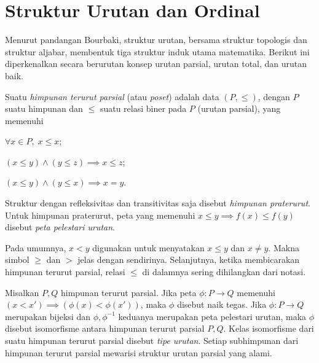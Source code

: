 \section{Struktur Urutan dan Ordinal}\label{sec:order}
Menurut pandangan Bourbaki, struktur urutan, bersama struktur topologis dan struktur aljabar, membentuk tiga struktur induk utama matematika. Berikut ini diperkenalkan secara berurutan konsep urutan parsial, urutan total, dan urutan baik.

\begin{definition}\label{def:partial-order}
	Suatu \emph{himpunan terurut parsial} (atau \emph{poset}) adalah data $(P, \leq)$, dengan $P$ suatu himpunan dan $\leq$ suatu relasi biner pada $P$ (urutan parsial), yang memenuhi
	\begin{compactdesc}
		\item[Refleksivitas] $\forall x \in P, \; x \leq x$;
		\item[Transitivitas] $(x \leq y) \wedge (y \leq z) \implies x \leq z$;
		\item[Antisimetri] $(x \leq y) \wedge (y \leq x) \implies x=y$.
	\end{compactdesc}
	Struktur dengan refleksivitas dan transitivitas saja disebut \emph{himpunan praterurut}. Untuk himpunan praterurut, peta yang memenuhi $x \leq y \implies f(x) \leq f(y)$ disebut \emph{peta pelestari urutan}.

	Pada umumnya, $x < y$ digunakan untuk menyatakan $x \leq y$ dan $x \neq y$. Makna simbol $\geq$ dan $>$ jelas dengan sendirinya. Selanjutnya, ketika membicarakan himpunan terurut parsial, relasi $\leq$ di dalamnya sering dihilangkan dari notasi.
\end{definition}

Misalkan $P, Q$ himpunan terurut parsial. Jika peta $\phi: P \to Q$ memenuhi $(x < x') \implies (\phi(x) < \phi(x'))$, maka $\phi$ disebut naik tegas. Jika $\phi: P \to Q$ merupakan bijeksi dan $\phi, \phi^{-1}$ keduanya merupakan peta pelestari urutan, maka $\phi$ disebut isomorfisme antara himpunan terurut parsial $P,Q$. Kelas isomorfisme dari suatu himpunan terurut parsial disebut \emph{tipe urutan}. Setiap subhimpunan dari himpunan terurut parsial mewarisi struktur urutan parsial yang alami.

